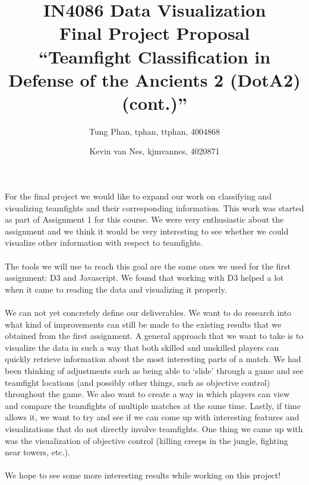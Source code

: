 \documentclass[11pt,twoside,a4paper]{article}
\title{
  IN4086 Data Visualization\\
  Final Project Proposal\\
  ``Teamfight Classification in Defense of the Ancients 2 (DotA2) (cont.)''
}
\author{
    Tung Phan, tphan, ttphan, 4004868 \and
    Kevin van Nes, kjmvannes, 4020871
}
\begin{document}
\maketitle

For the final project we would like to expand our work on classifying and visualizing teamfights and their corresponding information. This work was started as part of Assignment 1 for this course. We were very enthusiastic about the assignment and we think it would be very interesting to see whether we could visualize other information with respect to teamfights.\\
\\
The tools we will use to reach this goal are the same ones we used for the first assignment: D3 and Javascript. We found that working with D3 helped a lot when it came to reading the data and visualizing it properly.\\
\\
We can not yet concretely define our deliverables. We want to do research into what kind of improvements can still be made to the existing results that we obtained from the first assignment. A general approach that we want to take is to visualize the data in such a way that both skilled and unskilled players can quickly retrieve information about the most interesting parts of a match. We had been thinking of adjustments such as being able to `slide' through a game and see teamfight locations (and possibly other things, such as objective control) throughout the game. We also want to create a way in which players can view and compare the teamfights of multiple matches at the same time. Lastly, if time allows it, we want to try and see if we can come up with interesting features and visualizations that do not directly involve teamfights. One thing we came up with was the visualization of objective control (killing creeps in the jungle, fighting near towers, etc.).\\
\\
We hope to see some more interesting results while working on this project!
\end{document}
